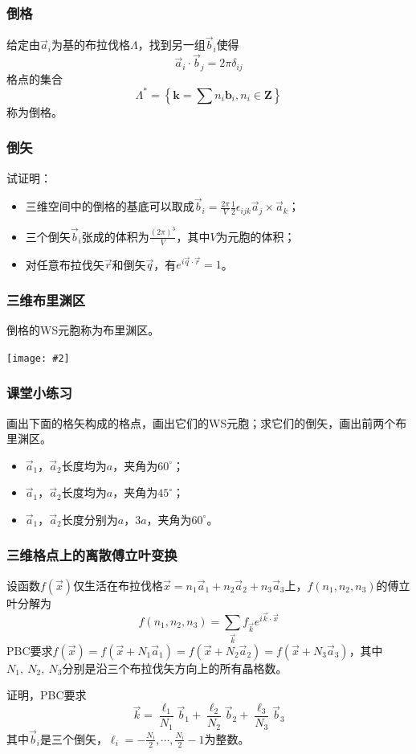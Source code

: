 \documentclass[CJK]{beamer}
\newcommand{\cpic}[2]{
\begin{center}
\texttt{[image: \#2]}
\end{center}
}
\begin{document}
\begin{frame}
\ech
\end{frame}

\begin{frame}
\frametitle{\bch 倒格 \ech}
\bch
给定由$\vec{a}_i$为基的布拉伐格$\Lambda$，找到另一组$\vec{b}_i$使得
$$
\vec{a}_i \cdot \vec{b}_j = 2\pi \delta_{ij}
$$
格点的集合
$$
\Lambda^{*}=\left\{\mathbf{k}=\sum n_{i} \mathbf{b}_{i}, n_{i} \in \mathbf{Z}\right\}
$$称为倒格。
\par

\ech
\end{frame}

\begin{frame}
\frametitle{\bch 倒矢 \ech}
\bch
试证明：
\begin{itemize}
\item 三维空间中的倒格的基底可以取成$\vec{b}_i = \frac{2\pi}{V} \frac{1}{2} \epsilon_{ijk} \vec{a}_j \times \vec{a}_k$；
\item 三个倒矢$\vec{b}_i$张成的体积为$\frac{(2\pi)^3}{V}$，其中$V$为元胞的体积；
\item 对任意布拉伐矢$\vec r$和倒矢$\vec q$，有$e^{i\vec q \cdot \vec r } =1$。
\end{itemize}
\ech
\end{frame}

\begin{frame}
\frametitle{\bch 三维布里渊区 \ech}
\bch
倒格的WS元胞称为布里渊区。
\cpic{0.4}{brillouin}
\ech
\end{frame}

\begin{frame}
\frametitle{\bch 课堂小练习 \ech}
\bch
画出下面的格矢构成的格点，画出它们的WS元胞；求它们的倒矢，画出前两个布里渊区。
\begin{itemize}
\item $\vec{a}_1$，$\vec{a}_2$长度均为$a$，夹角为$60^\circ$；
\item $\vec{a}_1$，$\vec{a}_2$长度均为$a$，夹角为$45^\circ$；
\item $\vec{a}_1$，$\vec{a}_2$长度分别为$a$，$3a$，夹角为$60^\circ$。
\end{itemize}
\ech
\end{frame}




\begin{frame}
\frametitle{\bch 三维格点上的离散傅立叶变换 \ech}
\bch
设函数$f(\vec x)$仅生活在布拉伐格$\vec{x} = n_1 \vec{a}_1 + n_2 \vec{a}_2 + n_3 \vec{a}_3$上，$f(n_1,n_2,n_3)$的傅立叶分解为
$$f(n_1,n_2,n_3) = \sum_{\vec k} f_{\vec k} e^{i\vec k \cdot \vec x}$$
PBC要求$f(\vec x) = f(\vec x + N_1 \vec{a}_1) = f(\vec x + N_2 \vec{a}_2) = f(\vec x + N_3 \vec{a}_3)$，其中$N_1,\ N_2,\ N_3$分别是沿三个布拉伐矢方向上的所有晶格数。
\par
证明，PBC要求
$$
\vec k = \frac{\ell_1}{N_1} \vec{b}_1 + \frac{\ell_2}{N_2} \vec{b}_2 + \frac{\ell_3}{N_3} \vec{b}_3
$$
其中$\vec{b}_i$是三个倒矢，$\ell_i= -\frac{N_i}{2},\cdots,\frac{N_i}{2} - 1$为整数。

\ech
\end{frame}
\end{document}
